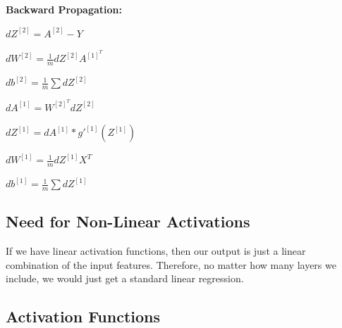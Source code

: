 \textbf{Backward Propagation:}

$dZ^{[2]} = A^{[2]} - Y$

$dW^{[2]} = \frac{1}{m} dZ^{[2]} A^{[1]^T}$

$db^{[2]} = \frac{1}{m} \sum dZ^{[2]}$

$dA^{[1]} = W^{[2]^T} dZ^{[2]}$

$dZ^{[1]} = dA^{[1]} * g'^{[1]} (Z^{[1]})$

$dW^{[1]} = \frac{1}{m} dZ^{[1]} X^T$

$db^{[1]} = \frac{1}{m}  \sum dZ^{[1]}$

\subsection{Need for Non-Linear Activations}

If we have linear activation functions, then our output is just a linear combination of the input features. Therefore, no matter how many layers we include, we would just get a standard linear regression.

\subsection{Activation Functions}

\vspace{0.25cm}

